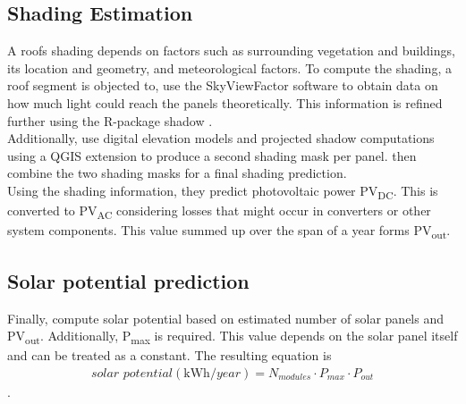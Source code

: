 \documentclass{article} %
\begin{document}
\subsection*{Shading Estimation}
A roofs shading depends on factors such as surrounding vegetation and buildings, its location and geometry, and meteorological factors. To compute the shading, a roof segment is objected to, \citet{de2021predicting} use the SkyViewFactor software \cite{zakvsek2011sky} to obtain data on how much light could reach the panels theoretically. This information is refined further using the R-package shadow \cite{dorman2019shadow}.\\
Additionally, \citet{de2021predicting} use digital elevation models and projected shadow computations using a QGIS extension \cite{qgis,qgisshadows} to produce a second shading mask per panel. \citet{de2021predicting} then combine the two shading masks for a final shading prediction.\\
Using the shading information, they predict photovoltaic power \si{PV_{\si{DC}}}. This is converted to \si{PV_{\si{AC}}} considering losses that might occur in converters or other system components. This value summed up over the span of a year forms \si{PV_{out}}.



\subsection*{Solar potential prediction}
Finally, \citet{de2021predicting} compute solar potential based on estimated number of solar panels and \si{PV_{out}}. Additionally, \si{P_{max}} is required. This value 	depends on the solar panel itself and can be treated as a constant. The resulting equation is
\begin{align*}
	\textit{solar potential} (\si{\kilo\watt \hour \per year}) = N_{\textit{modules}} \cdot \si{P_{max}} \cdot \si{P_{out}}
\end{align*}.
\end{document}
